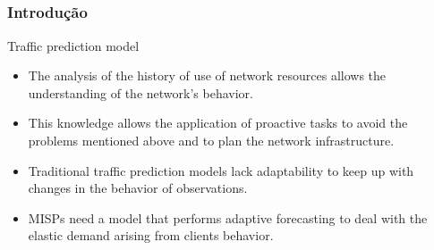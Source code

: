 \documentclass[aspectratio=169]{beamer}
\begin{document}

\subsection{}
\begin{frame}
\frametitle{Introdução}
\begin{block}{Traffic prediction model}
    \begin{itemize}
        \item The analysis of the history of use of network resources allows the understanding of the network's behavior.
        \item This knowledge allows the application of proactive tasks to avoid the problems mentioned above and to plan the network infrastructure.
        \item Traditional traffic prediction models lack adaptability to keep up with changes in the behavior of observations.
        \item MISPs need a model that performs adaptive forecasting to deal with the elastic demand arising from clients behavior.
    \end{itemize}
\end{block}
\end{frame}

\end{document}
